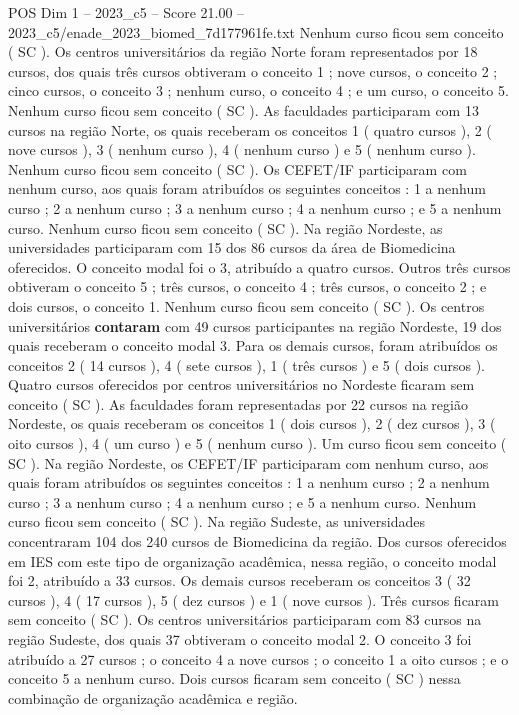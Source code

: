 \begin{textsample}{POS Dim 1 – 2023\_c5 – Score 21.00 – 2023\_c5/enade\_2023\_biomed\_7d177961fe.txt}
Nenhum curso ficou sem conceito ( SC ).
Os centros universitários da região Norte foram representados por 18 cursos, dos quais três cursos obtiveram o conceito 1 ; nove cursos, o conceito 2 ; cinco cursos, o conceito 3 ; nenhum curso, o conceito 4 ; e um curso, o conceito 5.
Nenhum curso ficou sem conceito ( SC ).
As faculdades participaram com 13 cursos na região Norte, os quais receberam os conceitos 1 ( quatro cursos ), 2 ( nove cursos ), 3 ( nenhum curso ), 4 ( nenhum curso ) e 5 ( nenhum curso ).
Nenhum curso ficou sem conceito ( SC ).
Os CEFET/IF participaram com nenhum curso, aos quais foram atribuídos os seguintes conceitos : 1 a nenhum curso ; 2 a nenhum curso ; 3 a nenhum curso ; 4 a nenhum curso ; e 5 a nenhum curso.
Nenhum curso ficou sem conceito ( SC ).
Na região Nordeste, as universidades participaram com 15 dos 86 cursos da área de Biomedicina oferecidos.
O conceito modal foi o 3, atribuído a quatro cursos.
Outros três cursos obtiveram o conceito 5 ; três cursos, o conceito 4 ; três cursos, o conceito 2 ; e dois cursos, o conceito 1.
Nenhum curso ficou sem conceito ( SC ).
Os centros universitários \textbf{contaram} com 49 cursos participantes na região Nordeste, 19 dos quais receberam o conceito modal 3.
Para os demais cursos, foram atribuídos os conceitos 2 ( 14 cursos ), 4 ( sete cursos ), 1 ( três cursos ) e 5 ( dois cursos ).
Quatro cursos oferecidos por centros universitários no Nordeste ficaram sem conceito ( SC ).
As faculdades foram representadas por 22 cursos na região Nordeste, os quais receberam os conceitos 1 ( dois cursos ), 2 ( dez cursos ), 3 ( oito cursos ), 4 ( um curso ) e 5 ( nenhum curso ).
Um curso ficou sem conceito ( SC ).
Na região Nordeste, os CEFET/IF participaram com nenhum curso, aos quais foram atribuídos os seguintes conceitos : 1 a nenhum curso ; 2 a nenhum curso ; 3 a nenhum curso ; 4 a nenhum curso ; e 5 a nenhum curso.
Nenhum curso ficou sem conceito ( SC ).
Na região Sudeste, as universidades concentraram 104 dos 240 cursos de Biomedicina da região.
Dos cursos oferecidos em IES com este tipo de organização acadêmica, nessa região, o conceito modal foi 2, atribuído a 33 cursos.
Os demais cursos receberam os conceitos 3 ( 32 cursos ), 4 ( 17 cursos ), 5 ( dez cursos ) e 1 ( nove cursos ).
Três cursos ficaram sem conceito ( SC ).
Os centros universitários participaram com 83 cursos na região Sudeste, dos quais 37 obtiveram o conceito modal 2.
O conceito 3 foi atribuído a 27 cursos ; o conceito 4 a nove cursos ; o conceito 1 a oito cursos ; e o conceito 5 a nenhum curso.
Dois cursos ficaram sem conceito ( SC ) nessa combinação de organização acadêmica e região.

\end{textsample}

